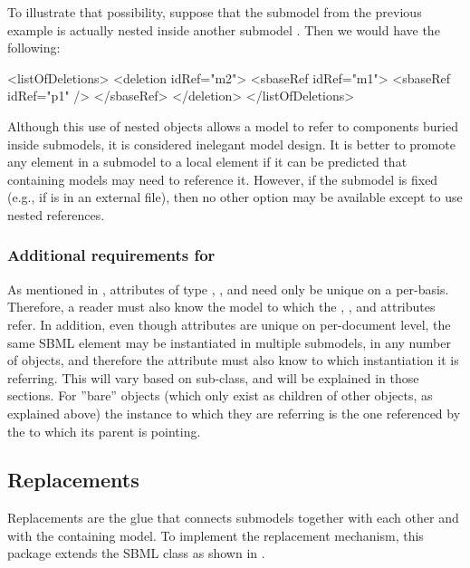To illustrate that possibility, suppose that the submodel  from
the previous example is actually nested inside another submodel
.  Then we would have the following:

\begin{example}
<listOfDeletions>
  <deletion idRef="m2">
    <sbaseRef idRef="m1">
      <sbaseRef idRef="p1" />
    </sbaseRef>
  </deletion>
</listOfDeletions>
\end{example}

Although this use of nested \SBaseRef objects allows a model to refer to
components buried inside submodels, it is considered inelegant model
design.  It is better to promote any element in a submodel to a local
element if it can be predicted that containing models may need to
reference it.  However, if the submodel is fixed (e.g., if is in an
external file), then no other option may be available except to use
nested references.

\subsubsection{Additional requirements for }

As mentioned in , attributes of type ,
, and  need only be unique on a
per-\Model basis.  Therefore, a reader must also know the model to which
the , , and  attributes
refer.  In addition, even though  attributes are unique
on per-document level, the same SBML element may be instantiated in
multiple submodels, in any number of \Model objects, and therefore the
 attribute must also know to which \Model instantiation
it is referring.  This will vary based on \SBaseRef sub-class, and will
be explained in those sections.  For ''bare'' \SBaseRef objects (which
only exist as children of other \SBaseRef objects, as explained above)
the \Model instance to which they are referring is the one referenced by
the \Submodel to which its parent is pointing.


\subsection{Replacements}
\label{replacements}
\label{extended-sbase-class}

Replacements are the glue that connects submodels together with each
other and with the containing model.  To implement the replacement
mechanism, this package extends the SBML \SBase class as shown in
.

